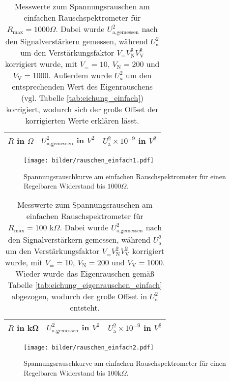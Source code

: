 \begin{table}[h]
			\centering
			\begin{tabular}{ccc}
				\toprule \midrule
				$R$ in $\Omega$ & $U_\text{a,gemessen}^2$ in $V^2$
				& $U_\text{a}^2 \times 10^{-9}$ in $V^2$ \\
				\midrule
				
				\midrule \bottomrule
			\end{tabular}
			\caption{Messwerte zum Spannungsrauschen am einfachen
			Rauschspektrometer für $R_\text{max}=1000 \Omega$.
			Dabei wurde $U_\text{a,gemessen}^2$ nach den Signalverstärkern gemessen, während
			$U_\text{a}^2$ um den Verstärkungsfaktor $V_= V_\text{N}^2 V_\text{V}^2$ korrigiert
			wurde, mit $V_=
			=10$, $V_\text{N}=200$ und $V_\text{V}=1000$. Außerdem wurde
			$U^2_a$ um den entsprechenden Wert des Eigenrauschens (vgl.
			Tabelle \ref{tab:eichung_einfach}) korrigiert, wodurch sich
			der große Offset der korrigierten Werte erklären lässt.
			}
			\label{tab:rauschen_einfach1}
\end{table}
\begin{figure}[h]
			\centering
			\texttt{[image: bilder/rauschen\_einfach1.pdf]}
			\caption{Spannungsrauschkurve am einfachen Rauschspektrometer für einen
			Regelbaren Widerstand bis $1000\Omega$.}
			\label{fig:rauschen_einfach1}
	\end{figure}




	\begin{table}[h]
			\centering
			\begin{tabular}{ccc}
				\toprule \midrule
				$R$ in \si{\kilo\ohm} & $U_\text{a,gemessen}^2$ in $V^2$
				& $U_\text{a}^2 \times 10^{-9}$ in $V^2$\\
				\midrule
				
				\midrule \bottomrule
			\end{tabular}
			\caption{Messwerte zum Spannungsrauschen am einfachen
			Rauschspektrometer für $R_\text{max}=100 \text{ k}\Omega$.
			Dabei wurde $U_\text{a,gemessen}^2$ nach den Signalverstärkern gemessen, während
			$U_\text{a}^2$ um den Verstärkungsfaktor $V_= V_\text{N}^2 V_\text{V}^2$ korrigiert
			wurde, mit $V_=
			=10$, $V_\text{N}=200$ und $V_\text{V}=1000$. Wieder wurde das
			Eigenrauschen gemäß Tabelle \ref{tab:eichung_eigenrauschen_einfach}
			abgezogen, wodurch der große Offset in $U_\text{a}^2$ entsteht. }
			\label{tab:rauschen_einfach2}
	\end{table}
	\begin{figure}[h]
			\centering
			\texttt{[image: bilder/rauschen\_einfach2.pdf]}
			\caption{Spannungsrauschkurve am einfachen Rauschspektrometer für einen
			Regelbaren Widerstand bis $100\text{k}\Omega$.}
			\label{fig:rauschen_einfach2}

	\end{figure}


